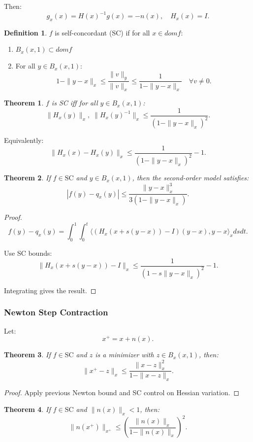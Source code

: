 \documentclass[12pt,oneside]{book}
\numberwithin{equation}{section}
\theoremstyle{definition}
\newtheorem{definition}{Definition}[section]
\theoremstyle{plain}
\newtheorem{theorem}{Theorem}[section]
\theoremstyle{remark}
\begin{document}
Then:
\[
g_x(x) = H(x)^{-1} g(x) = -n(x),
\quad
H_x(x) = I.
\]

\begin{definition}
$f$ is self-concordant (SC) if for all $x \in dom f$:
\begin{enumerate}
\item $B_x(x,1) \subset dom f$
\item For all $y \in B_x(x,1)$:
\[
1 - \|y-x\|_x
\le
\frac{\|v\|_y}{\|v\|_x}
\le
\frac{1}{1-\|y-x\|_x}
\quad \forall v \ne 0.
\]
\end{enumerate}
\end{definition}

\begin{theorem}
$f$ is SC iff for all $y \in B_x(x,1)$:
\[
\|H_x(y)\|_x, \;\|H_x(y)^{-1}\|_x
\le \frac{1}{(1-\|y-x\|_x)^2}.
\]
\end{theorem}

Equivalently:
\[
\|H_x(x) - H_x(y)\|_x
\le
\frac{1}{(1-\|y-x\|_x)^2} - 1.
\]

\begin{theorem}
If $f \in \mathrm{SC}$ and $y \in B_x(x,1)$, then the second-order model satisfies:
\[
|f(y) - q_x(y)|
\le
\frac{\|y-x\|_x^3}{3(1-\|y-x\|_x)}.
\]
\end{theorem}

\begin{proof}
\[
f(y) - q_x(y)
=
\int_0^1 \int_0^t
\langle (H_x(x+s(y-x)) - I)(y-x), y-x \rangle_x ds dt.
\]

Use SC bounds:
\[
\|H_x(x+s(y-x)) - I\|_x
\le
\frac{1}{(1-s\|y-x\|_x)^2} - 1.
\]

Integrating gives the result.
\end{proof}

\subsubsection*{Newton Step Contraction}

Let:
\[
x^+ = x + n(x).
\]

\begin{theorem}
If $f \in \mathrm{SC}$ and $z$ is a minimizer with $z \in B_x(x,1)$, then:
\[
\|x^+ - z\|_x
\le
\frac{\|x-z\|_x^2}{1-\|x-z\|_x}.
\]
\end{theorem}

\begin{proof}
Apply previous Newton bound and SC control on Hessian variation.
\end{proof}

\begin{theorem}
If $f \in \mathrm{SC}$ and $\|n(x)\|_x < 1$, then:
\[
\|n(x^+)\|_{x^+}
\le
\left(\frac{\|n(x)\|_x}{1-\|n(x)\|_x}\right)^2.
\]
\end{theorem}
\end{document}
